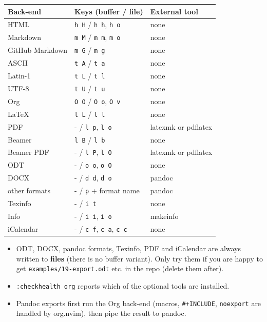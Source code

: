 \begin{center}
\begin{tabular}{lll}
Back-end & Keys (buffer / file) & External tool\\
\hline
HTML & \texttt{h H} / \texttt{h h}, \texttt{h o} & none\\
Markdown & \texttt{m M} / \texttt{m m}, \texttt{m o} & none\\
GitHub Markdown & \texttt{m G} / \texttt{m g} & none\\
ASCII & \texttt{t A} / \texttt{t a} & none\\
Latin-1 & \texttt{t L} / \texttt{t l} & none\\
UTF-8 & \texttt{t U} / \texttt{t u} & none\\
Org & \texttt{O O} / \texttt{O o}, \texttt{O v} & none\\
\LaTeX{} & \texttt{l L} / \texttt{l l} & none\\
PDF & - / \texttt{l p}, \texttt{l o} & latexmk or pdflatex\\
Beamer & \texttt{l B} / \texttt{l b} & none\\
Beamer PDF & - / \texttt{l P}, \texttt{l O} & latexmk or pdflatex\\
ODT & - / \texttt{o o}, \texttt{o O} & none\\
DOCX & - / \texttt{d d}, \texttt{d o} & pandoc\\
other formats & - / \texttt{p} + format name & pandoc\\
Texinfo & - / \texttt{i t} & none\\
Info & - / \texttt{i i}, \texttt{i o} & makeinfo\\
iCalendar & - / \texttt{c f}, \texttt{c a}, \texttt{c c} & none\\
\end{tabular}
\end{center}

\begin{itemize}
\item ODT, DOCX, pandoc formats, Texinfo, PDF and iCalendar are always written
to \textbf{files} (there is no buffer variant). Only try them if you are happy
to get \texttt{examples/19-export.odt} etc. in the repo (delete them after).
\item \texttt{:checkhealth org} reports which of the optional tools are installed.
\item Pandoc exports first run the Org back-end (macros, \texttt{\#+INCLUDE},
\texttt{noexport} are handled by org.nvim), then pipe the result to pandoc.
\end{itemize}
